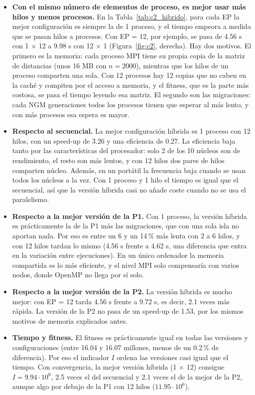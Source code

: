 \documentclass[12pt]{article}
\begin{document}
\begin{enumerate}
\begin{itemize}
    \item \textbf{Con el mismo número de elementos de proceso, es mejor usar más hilos y menos procesos.} En la Tabla~\ref{tab:c2_hibrido}, para cada EP la mejor configuración es siempre la de 1 proceso, y el tiempo empeora a medida que se pasan hilos a procesos. Con EP = 12, por ejemplo, se pasa de 4.56 s con 1 $\times$ 12 a 9.98 s con 12 $\times$ 1 (Figura~\ref{fig:c2}, derecha). Hay dos motivos. El primero es la memoria: cada proceso MPI tiene su propia copia de la matriz de distancias (unos 16 MB con $n = 2000$), mientras que los hilos de un proceso comparten una sola. Con 12 procesos hay 12 copias que no caben en la caché y compiten por el acceso a memoria, y el fitness, que es la parte más costosa, se pasa el tiempo leyendo esa matriz. El segundo son las migraciones: cada NGM generaciones todos los procesos tienen que esperar al más lento, y con más procesos esa espera es mayor.
    \item \textbf{Respecto al secuencial.} La mejor configuración híbrida es 1 proceso con 12 hilos, con un speed-up de 3.26 y una eficiencia de 0.27. La eficiencia baja tanto por las características del procesador: solo 2 de los 10 núcleos son de rendimiento, el resto son más lentos, y con 12 hilos dos pares de hilos comparten núcleo. Además, en un portátil la frecuencia baja cuando se usan todos los núcleos a la vez. Con 1 proceso y 1 hilo el tiempo es igual que el secuencial, así que la versión híbrida casi no añade coste cuando no se usa el paralelismo.
    \item \textbf{Respecto a la mejor versión de la P1.} Con 1 proceso, la versión híbrida es prácticamente la de la P1 más las migraciones, que con una sola isla no aportan nada. Por eso es entre un 6 y un 14\,\% más lenta con 2 a 6 hilos, y con 12 hilos tardan lo mismo (4.56 s frente a 4.62 s, una diferencia que entra en la variación entre ejecuciones). En un único ordenador la memoria compartida es lo más eficiente, y el nivel MPI solo compensaría con varios nodos, donde OpenMP no llega por sí solo.
    \item \textbf{Respecto a la mejor versión de la P2.} La versión híbrida es mucho mejor: con EP = 12 tarda 4.56 s frente a 9.72 s, es decir, 2.1 veces más rápida. La versión de la P2 no pasa de un speed-up de 1.53, por los mismos motivos de memoria explicados antes.
    \item \textbf{Tiempo y fitness.} El fitness es prácticamente igual en todas las versiones y configuraciones (entre 16.04 y 16.07 millones, menos de un 0.2\,\% de diferencia). Por eso el indicador $I$ ordena las versiones casi igual que el tiempo. Con convergencia, la mejor versión híbrida (1 $\times$ 12) consigue $I = 9.94 \cdot 10^6$, 2.5 veces el del secuencial y 2.1 veces el de la mejor de la P2, aunque algo por debajo de la P1 con 12 hilos ($11.95 \cdot 10^6$).

\end{itemize}
\end{enumerate}
\end{document}
